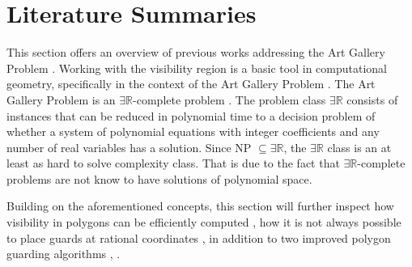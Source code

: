 \section{Literature Summaries}
\label{sec:literature}

This section offers an overview of previous works addressing the Art Gallery Problem \cite{o1987art}. 
Working with the visibility region is a basic tool in computational geometry, specifically in the context of the Art Gallery Problem \cite{o1987art}. The Art Gallery Problem \cite{o1987art} is an $\exists \mathbb R$-complete problem \cite{abrahamsen2021art}. The problem class $\exists \mathbb R$ consists of instances that can be reduced in polynomial time to a decision problem of whether a system of polynomial equations with integer coefficients and any number of real variables has a solution. Since NP $\subseteq \exists \mathbb R$, the $\exists \mathbb R$ class is an at least as hard to solve complexity class. That is due to the fact that $\exists \mathbb R$-complete problems are not know to have solutions of polynomial space. 

Building on the aforementioned concepts, this section will further inspect how visibility in polygons can be efficiently computed \cite{DBLP:journals/corr/BungiuHHHK14}, how it is not always possible to place guards at rational coordinates \cite{abrahamsen2021art}, in addition to two improved polygon guarding algorithms \cite{maleki2022implementation}, \cite{DBLP:journals/corr/abs-2007-06920}.





\newpage

\newpage
